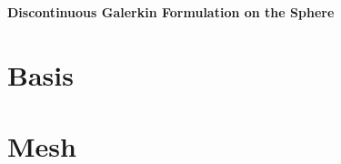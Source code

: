 \documentclass[oneside]{article}
\begin{document}
  \begin{center}
    \textbf{\Large{Discontinuous Galerkin Formulation on the Sphere}} \\
  \end{center}

  \section{Basis}
    

  \section{Mesh}
\end{document}
